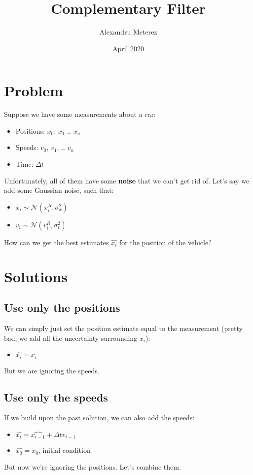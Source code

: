 \documentclass{article}
\title{Complementary Filter}
\author{Alexandru Meterez}
\date{April 2020}
\begin{document}
\maketitle

\section{Problem}
Suppose we have some measurements about a car:
\begin{itemize}
    \item Positions: $x_0$, $x_1$ .. $x_n$
    \item Speeds: $v_0$, $v_1$, .. $v_n$
    \item Time: $\Delta t$
\end{itemize}
Unfortunately, all of them have some \textbf{noise} that we can't get rid of. Let's say we add some Gaussian noise, such that:
\begin{itemize}
    \item $x_i \sim \mathcal{N}(x_i^R, \sigma_x^2)$
    \item $v_i \sim \mathcal{N}(v_i^R, \sigma_v^2)$ 
\end{itemize}
How can we get the best estimates $\hat{x_i}$ for the position of the vehicle?

\section{Solutions}
\subsection{Use only the positions}
We can simply just set the position estimate equal to the measurement (pretty bad, we add all the uncertainty surrounding $x_i$):
\begin{itemize}
    \item $\hat{x_i} = x_i$
\end{itemize}
But we are ignoring the speeds.

\subsection{Use only the speeds}
If we build upon the past solution, we can also add the speeds:
\begin{itemize}
    \item $\hat{x_i} = \hat{x_{i-1}} + \Delta t v_{i-1}$
    \item $\hat{x_0} = x_0$, initial condition
\end{itemize}
But now we're ignoring the positions. Let's combine them.
\end{document}
